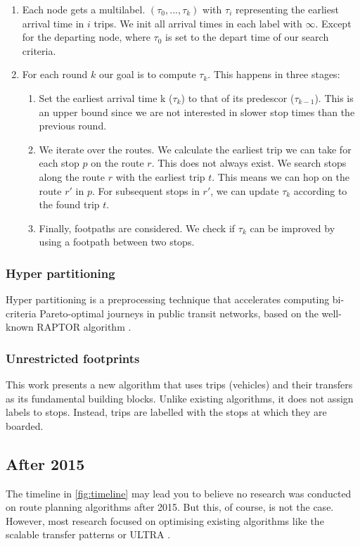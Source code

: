 \begin{enumerate}
    \item Each node gets a multilabel. $(\tau_0,...,\tau_k)$ with $\tau_i$ representing the earliest arrival time in $i$ trips. We init all arrival times in each label with $\infty$. Except for the departing node, where $\tau_0$ is set to the depart time of our search criteria.
    \item For each round $k$ our goal is to compute $\tau_k$. This happens in three stages:\begin{enumerate}
        \item Set the earliest arrival time k ($\tau_k$) to that of its predescor ($\tau_{k-1}$). This is an upper bound since we are not interested in slower stop times than the previous round.
        \item We iterate over the routes. We calculate the earliest trip we can take for each stop $p$ on the route $r$. This does not always exist. We search stops along the route $r$ with the earliest trip $t$. This means we can hop on the route $r'$ in $p$. For subsequent stops in $r'$, we can update $\tau_k$ according to the found trip $t$.
        \item Finally, footpaths are considered. We check if $\tau_k$ can be improved by using a footpath between two stops. 
    \end{enumerate}
\end{enumerate}

\subsubsection{Hyper partitioning}
Hyper partitioning is a preprocessing technique that accelerates computing bi-criteria Pareto-optimal journeys in public transit networks, based on the well-known RAPTOR algorithm \cite{delling_round-based_2015}.
\subsubsection{Unrestricted footprints}
This work\cite{baum_ultra_2023} presents a new algorithm that uses trips (vehicles) and their transfers as its fundamental building blocks. Unlike existing algorithms, it does not assign labels to stops. Instead, trips are labelled with the stops at which they are boarded.
\subsection{After 2015}
The timeline in \autoref{fig:timeline} may lead you to believe no research was conducted on route planning algorithms after 2015. But this, of course, is not the case. However, most research focused on optimising existing algorithms like the scalable transfer patterns\cite{bast_scalable_2015} or ULTRA \cite{baum_ultra_2023}.

